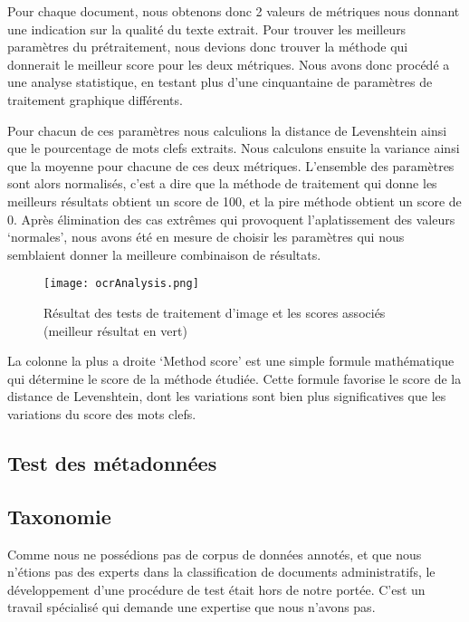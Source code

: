 Pour chaque document, nous obtenons donc 2 valeurs de métriques nous donnant une indication sur la qualité du texte extrait.
Pour trouver les meilleurs paramètres du prétraitement, nous devions donc trouver la méthode qui donnerait le meilleur score pour les deux métriques.
Nous avons donc procédé a une analyse statistique, en testant plus d'une cinquantaine de paramètres de traitement graphique différents.

Pour chacun de ces paramètres nous calculions la distance de Levenshtein ainsi que le pourcentage de mots clefs extraits.
Nous calculons ensuite la variance ainsi que la moyenne pour chacune de ces deux métriques.
L'ensemble des paramètres sont alors normalisés, c'est a dire que la méthode de traitement qui donne les meilleurs résultats obtient un score de 100, et la pire méthode obtient un score de 0.
Après élimination des cas extrêmes qui provoquent l'aplatissement des valeurs `normales', nous avons été en mesure de choisir les paramètres qui nous semblaient donner la meilleure combinaison de résultats.


\begin{figure}[h!]
  \centering
  \texttt{[image: ocrAnalysis.png]}
	\caption[]{Résultat des tests de traitement d'image et les scores associés (meilleur résultat en vert)}
	\label{fig:ocrRes}
\end{figure}

La colonne la plus a droite `Method score' est une simple formule mathématique qui détermine le score de la méthode étudiée.
Cette formule favorise le score de la distance de Levenshtein, dont les variations sont bien plus significatives que les variations du score des mots clefs.


\subsection{Test des métadonnées}



\subsection{Taxonomie}
Comme nous ne possédions pas de corpus de données annotés, et que nous n'étions pas des experts dans la classification de documents administratifs, le développement d'une procédure de test était hors de notre portée.
C'est un travail spécialisé qui demande une expertise que nous n'avons pas.

